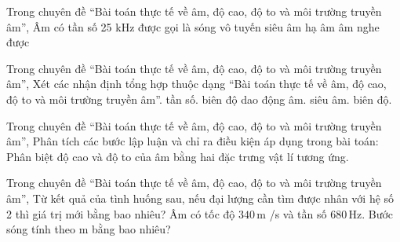 \begin{ex}
Trong chuyên đề “Bài toán thực tế về âm, độ cao, độ to và môi trường truyền âm”, Âm có tần số 25 kHz được gọi là
\choice
{sóng vô tuyến}
{\True siêu âm}
{hạ âm}
{âm nghe được}
\end{ex}

\begin{ex}
Trong chuyên đề “Bài toán thực tế về âm, độ cao, độ to và môi trường truyền âm”, Xét các nhận định tổng hợp thuộc dạng “Bài toán thực tế về âm, độ cao, độ to và môi trường truyền âm”.
\choiceTF
{\True tần số.}
{\True biên độ dao động âm.}
{\True siêu âm.}
{biên độ.}
\end{ex}

\begin{ex}
Trong chuyên đề “Bài toán thực tế về âm, độ cao, độ to và môi trường truyền âm”, Phân tích các bước lập luận và chỉ ra điều kiện áp dụng trong bài toán: Phân biệt độ cao và độ to của âm bằng hai đặc trưng vật lí tương ứng.
\choiceTF

\end{ex}

\begin{ex}
Trong chuyên đề “Bài toán thực tế về âm, độ cao, độ to và môi trường truyền âm”, Từ kết quả của tình huống sau, nếu đại lượng cần tìm được nhân với hệ số 2 thì giá trị mới bằng bao nhiêu? Âm có tốc độ $340\,\text{m}$ /s và tần số $680\,\text{Hz}$. Bước sóng tính theo m bằng bao nhiêu?
\end{ex}

